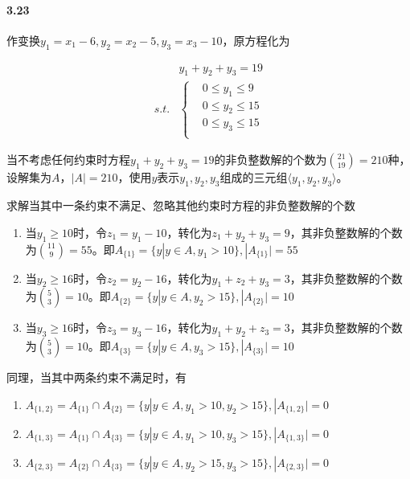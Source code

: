 \documentclass{../notes}
\begin{document}
    \paragraph*{3.23} 作变换$y_1 = x_1 - 6, y_2 = x_2 - 5, y_3 = x_3 - 10$，原方程化为

    \begin{equation}
        \begin{aligned}
            &y_1+y_2+y_3 = 19 \\
            s.t. &\left\{
            \begin{aligned}
                &0\leq y_1\leq 9 \\
                &0\leq y_2\leq 15 \\
                &0\leq y_3\leq 15 \\
            \end{aligned}
            \right.
        \end{aligned}
    \end{equation}

    当不考虑任何约束时方程$y_1+y_2+y_3 = 19$的非负整数解的个数为$\binom{21}{19} = 210$种，设解集为$A$，$|A|=210$，使用$y$表示$y_1, y_2, y_3$组成的三元组$\langle y_1, y_2, y_3\rangle$。

    求解当其中一条约束不满足、忽略其他约束时方程的非负整数解的个数

    \begin{enumerate}
        \item 当$y_1 \geq 10$时，令$z_1 = y_1 - 10$，转化为$z_1 + y_2 + y_3 = 9$，其非负整数解的个数为$\binom{11}{9}=55$。即$A_{\{1\}} = \{y|y\in A, y_1 > 10\}, |A_{\{1\}}| = 55$
        \item 当$y_2 \geq 16$时，令$z_2 = y_2 - 16$，转化为$y_1 + z_2 + y_3 = 3$，其非负整数解的个数为$\binom{5}{3}=10$。即$A_{\{2\}} = \{y|y\in A, y_2 > 15\}, |A_{\{2\}}| = 10$
        \item 当$y_3 \geq 16$时，令$z_3 = y_3 - 16$，转化为$y_1 + y_2 + z_3 = 3$，其非负整数解的个数为$\binom{5}{3}=10$。即$A_{\{3\}} = \{y|y\in A, y_3 > 15\}, |A_{\{3\}}| = 10$
    \end{enumerate}

    同理，当其中两条约束不满足时，有

    \begin{enumerate}
        \item $A_{\{1, 2\}} = A_{\{1\}}\cap A_{\{2\}} = \{y|y\in A, y_1 > 10, y_2 > 15\}, |A_{\{1, 2\}}| = 0$
        \item $A_{\{1, 3\}} = A_{\{1\}}\cap A_{\{3\}} = \{y|y\in A, y_1 > 10, y_3 > 15\}, |A_{\{1, 3\}}| = 0$
        \item $A_{\{2, 3\}} = A_{\{2\}}\cap A_{\{3\}} = \{y|y\in A, y_2 > 15, y_3 > 15\}, |A_{\{2, 3\}}| = 0$
    \end{enumerate}
\end{document}
